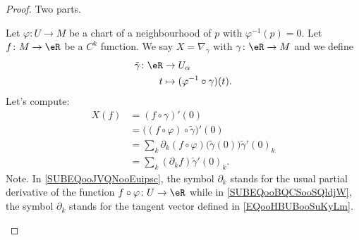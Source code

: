 \begin{proof}
	Two parts.
	\begin{subproof}
		\spitem[Existence]

		Let \(\varphi \colon U\to M \) be a chart of a neighbourhood of \( p\) with \( \varphi^{-1}(p)=0\). Let \(f \colon M\to \eR  \) be a \( C^k\) function. We say \( X=\nabla_{\gamma}\) with \(\gamma \colon \eR\to M  \) and we define
		\begin{equation}
			\begin{aligned}
				\tilde \gamma\colon \eR & \to U_{\alpha}                         \\
				t                       & \mapsto (\varphi^{-1}\circ \gamma)(t).
			\end{aligned}
		\end{equation}
		Let's compute:
		\begin{subequations}
			\begin{align}
				X(f) & =(f\circ\gamma)'(0)                                                                                           \\
				     & =\big((f\circ\varphi)\circ\tilde \gamma\big)'(0)                                                              \\
				     & = \sum_k\partial_k(f\circ\varphi)\big( \tilde \gamma(0) \big)\tilde \gamma'(0)_k		\label{SUBEQooJVQNooEuipsc} \\
				     & =\sum_k(\partial_kf)\tilde \gamma'(0)_k.		\label{SUBEQooBQCSooSQldjW}
			\end{align}
		\end{subequations}
		Note. In \eqref{SUBEQooJVQNooEuipsc}, the symbol \( \partial_k\) stands for the usual partial derivative of the function \(f\circ\varphi \colon U\to \eR  \) while in \eqref{SUBEQooBQCSooSQldjW}, the symbol \( \partial_k\) stands for the tangent vector defined in \eqref{EQooHBUBooSuKyLm}.


\end{subproof}
\end{proof}
